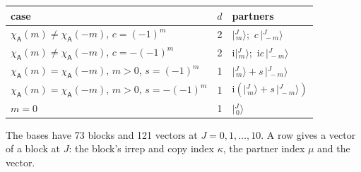 \documentclass[10pt,a4paper]{article}
\numberwithin{equation}{section}
\newcommand{\grp}[1]{\mathsf{#1}}
\newcommand{\iunit}{\mathrm{i}}
\newcommand{\chiA}{\chi_{\grp{A}}}
\newcommand{\mult}{\kappa}
\newcommand{\intx}{\mu}
\newcommand{\jm}[2]{\bigl\lvert{}^{#1}_{\,#2}\bigr\rangle}
\begin{document}
\begin{center}\begin{tabular}{@{}lrl@{}}\toprule
case & $d$ & partners\\\midrule
$\chiA(m) \ne \chiA(-m)$, $c = (-1)^m$ & 2 & $\jm{J}{m}$;\ $c\,\jm{J}{-m}$\\
$\chiA(m) \ne \chiA(-m)$, $c = -(-1)^m$ & 2 & $\iunit\jm{J}{m}$;\ $\iunit c\,\jm{J}{-m}$\\
$\chiA(m) = \chiA(-m)$, $m > 0$, $s = (-1)^m$ & 1 & $\jm{J}{m} + s\,\jm{J}{-m}$\\
$\chiA(m) = \chiA(-m)$, $m > 0$, $s = -(-1)^m$ & 1 & $\iunit(\jm{J}{m} + s\,\jm{J}{-m})$\\
$m = 0$ & 1 & $\jm{J}{0}$\\
\bottomrule\end{tabular}\end{center}
The bases have 73 blocks and 121 vectors at $J = 0, 1, \dots, 10$. \label{n:head.vector}A row gives a vector of a block at $J$: the block's irrep and copy index $\mult$, the partner index $\intx$ and the vector.
\end{document}
